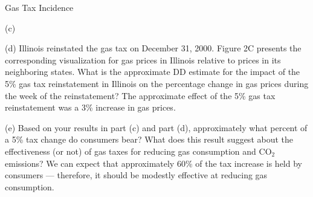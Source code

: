 \documentclass[8pt]{extarticle}
\begin{document}
\begin{problem}{Gas Tax Incidence}
\begin{problem}{(c)}
    \end{problem}
    \begin{problem}{(d)}
      Illinois reinstated the gas tax on December 31, 2000. Figure 2C presents the corresponding visualization for gas prices in Illinois relative to prices in its neighboring states. What is the approximate DD estimate for the impact of the 5\% gas tax reinstatement in Illinois on the percentage change in gas prices during the week of the reinstatement?
      \tcblower
      The approximate effect of the 5\% gas tax reinstatement was a 3\% increase in gas prices.
    \end{problem}
    \begin{problem}{(e)}
      Based on your results in part (c) and part (d), approximately what percent of a 5\% tax change do consumers bear? What does this result suggest about the effectiveness (or not) of gas taxes for reducing gas consumption and CO$_2$ emissions?
      \tcblower
      We can expect that approximately 60\% of the tax increase is held by consumers --- therefore, it should be modestly effective at reducing gas consumption.
    \end{problem}
  \end{problem}
\end{document}
